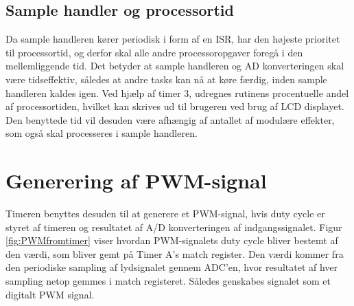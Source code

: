 \subsection{Sample handler og processortid}
Da sample handleren kører periodisk i form af en ISR, har den højeste prioritet til processortid, og derfor skal alle andre processoropgaver foregå i den mellemliggende tid.
Det betyder at sample handleren og AD konverteringen skal være tidseffektiv, således at andre tasks kan nå at køre færdig, inden sample handleren kaldes igen. 
Ved hjælp af timer 3, udregnes rutinens procentuelle andel af processortiden, hvilket kan skrives ud til brugeren ved brug af LCD displayet. 
Den benyttede tid vil desuden være afhængig af antallet af modulære effekter, som også skal processeres i sample handleren. 

\section{Generering af PWM-signal}

Timeren benyttes desuden til at generere et PWM-signal, hvis duty cycle er styret af timeren og resultatet af A/D konverteringen af indgangssignalet. 
Figur \ref{fig:PWMfromtimer} viser hvordan PWM-signalets duty cycle bliver bestemt af den værdi, som bliver gemt på Timer A's match register. 
Den værdi kommer fra den periodiske sampling af lydsignalet gennem ADC'en, hvor resultatet af hver sampling netop gemmes i match registeret. 
Således genskabes signalet som et digitalt PWM signal. 


